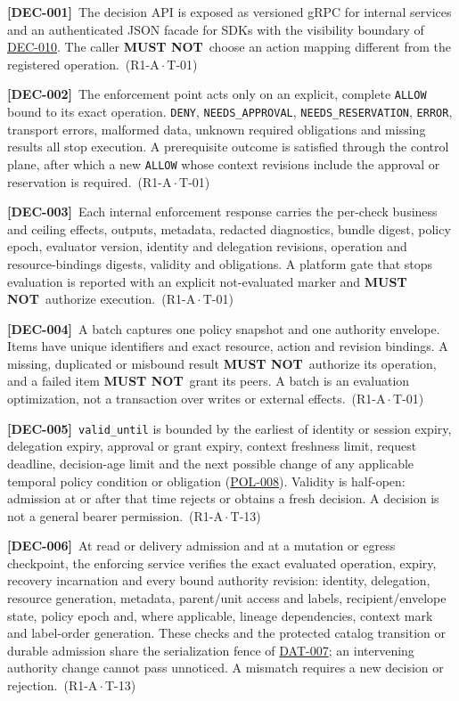 \documentclass[11pt,a4paper]{article}
\newcommand{\mustnot}{\textbf{MUST NOT}}
\newcommand{\code}[1]{{\small\nolinkurl{#1}}}
\newcommand{\rr}[1]{\hyperlink{req:#1}{#1}}
\newcommand{\reqtag}[2]{{\footnotesize\color{accent}(#1\,$\cdot$\,#2)}}
\newcommand{\req}[4]{\par\noindent\hypertarget{req:#1}{\textbf{[#1]}}\ #4\ \reqtag{#2}{#3}\par}
\begin{document}
\req{DEC-001}{R1-A}{T-01}{The decision API is exposed as versioned gRPC for internal services and an authenticated JSON facade for SDKs with the visibility boundary of \rr{DEC-010}. The caller \mustnot\ choose an action mapping different from the registered operation.}
\req{DEC-002}{R1-A}{T-01}{The enforcement point acts only on an explicit, complete \code{ALLOW} bound to its exact operation. \code{DENY}, \code{NEEDS_APPROVAL}, \code{NEEDS_RESERVATION}, \code{ERROR}, transport errors, malformed data, unknown required obligations and missing results all stop execution. A prerequisite outcome is satisfied through the control plane, after which a new \code{ALLOW} whose context revisions include the approval or reservation is required.}
\req{DEC-003}{R1-A}{T-01}{Each internal enforcement response carries the per-check business and ceiling effects, outputs, metadata, redacted diagnostics, bundle digest, policy epoch, evaluator version, identity and delegation revisions, operation and resource-bindings digests, validity and obligations. A platform gate that stops evaluation is reported with an explicit not-evaluated marker and \mustnot\ authorize execution.}
\req{DEC-004}{R1-A}{T-01}{A batch captures one policy snapshot and one authority envelope. Items have unique identifiers and exact resource, action and revision bindings. A missing, duplicated or misbound result \mustnot\ authorize its operation, and a failed item \mustnot\ grant its peers. A batch is an evaluation optimization, not a transaction over writes or external effects.}
\req{DEC-005}{R1-A}{T-13}{\code{valid_until} is bounded by the earliest of identity or session expiry, delegation expiry, approval or grant expiry, context freshness limit, request deadline, decision-age limit and the next possible change of any applicable temporal policy condition or obligation (\rr{POL-008}). Validity is half-open: admission at or after that time rejects or obtains a fresh decision. A decision is not a general bearer permission.}
\req{DEC-006}{R1-A}{T-13}{At read or delivery admission and at a mutation or egress checkpoint, the enforcing service verifies the exact evaluated operation, expiry, recovery incarnation and every bound authority revision: identity, delegation, resource generation, metadata, parent/unit access and labels, recipient/envelope state, policy epoch and, where applicable, lineage dependencies, context mark and label-order generation. These checks and the protected catalog transition or durable admission share the serialization fence of \rr{DAT-007}; an intervening authority change cannot pass unnoticed. A mismatch requires a new decision or rejection.}
\end{document}
